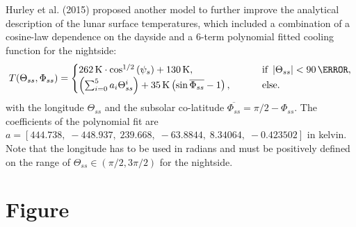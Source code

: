 \documentclass[
    fontsize=10pt,
    twoside=off,
    english,
]{scrbook}
\numberwithin{equation}{chapter}
\theoremstyle{break}
\theoremstyle{nonumberplain}
\begin{document}
Hurley et al. (2015) proposed another model to further improve the
analytical description of the lunar surface temperatures, which included
a combination of a cosine-law dependence on the dayside and a 6-term
polynomial fitted cooling function for the nightside: \begin{equation}
    T(\Theta_{ss}, \Phi_{ss}) = \begin{cases}
        262\,\mathrm{K} \cdot \cos^{1/2} \left( \psi_s \right) + 130\,\mathrm{K}, \qquad & \text{ if } \left|\Theta_{ss}\right| < 90\,\mathrm{\degree}, \\
        \left( \sum_{i=0}^5 a_i \Theta_{ss}^i \right) + 35\,\mathrm{K} \left( \sin \overline{\Phi_{ss}} - 1\right), \qquad & \text{ else.} 
    \end{cases} \label{eq:lunar_surface_temperatures_HURLEY} 
\end{equation} with the longitude \(\Theta_{ss}\) and the subsolar
co-latitude \(\overline{\Phi_{ss}} = \pi/2 - \Phi_{ss}\). The
coefficients of the polynomial fit are
\(a = \left[444.738,\; -448.937,\; 239.668,\; -63.8844,\; 8.34064,\; -0.423502 \right]\)
in kelvin. Note that the longitude has to be used in radians and must be
positively defined on the range of
\(\Theta_{ss} \in \left(\pi/2, 3\pi/2\right)\) for the nightside.

\section{Figure}
\end{document}
